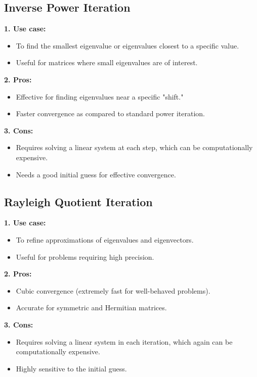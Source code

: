 \documentclass{article}
\begin{document}
\subsection{Inverse Power Iteration}
\textbf{1. Use case:}
\begin{itemize}
    \item To find the smallest eigenvalue or eigenvalues closest to a specific value.
    \item Useful for matrices where small eigenvalues are of interest.
\end{itemize}
\textbf{2. Pros:}
\begin{itemize}
    \item Effective for finding eigenvalues near a specific "shift."
    \item Faster convergence as compared to standard power iteration.
\end{itemize}
\textbf{3. Cons:}
\begin{itemize}
    \item Requires solving a linear system at each step, which can be computationally expensive.
    \item Needs a good initial guess for effective convergence.
\end{itemize}
\subsection{Rayleigh Quotient Iteration}
\textbf{1. Use case:}
\begin{itemize}
    \item To refine approximations of eigenvalues and eigenvectors.
    \item Useful for problems requiring high precision.
\end{itemize}
\textbf{2. Pros:}
\begin{itemize}
    \item Cubic convergence (extremely fast for well-behaved problems).
    \item Accurate for symmetric and Hermitian matrices.
\end{itemize}
\textbf{3. Cons:}
\begin{itemize}
    \item Requires solving a linear system in each iteration, which again can be computationally expensive.
    \item Highly sensitive to the initial guess.
\end{itemize}
\end{document}
